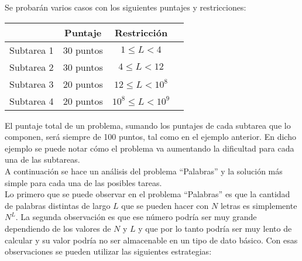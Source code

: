 \begin{ejemplo}
Se probarán varios casos con los siguientes puntajes y restricciones:
\begin{center}
\begin{tabular}{|r|c|c|c} \hline
&{\bf Puntaje} & {\bf Restricción} \\ \hline
Subtarea 1 &30 puntos & $1\leq L<4$ \\
Subtarea 2 &30 puntos & $4\leq L< 12$ \\
Subtarea 3 &20 puntos & $12\leq L<10^8$ \\
Subtarea 4 &20 puntos & $10^8\leq L<10^9$ \\ \hline
\end{tabular}
\end{center}
\end{ejemplo}\bigskip

El puntaje total de un problema, sumando los puntajes de cada subtarea que lo componen, será siempre de 100 puntos, tal como en el ejemplo anterior. En dicho ejemplo se puede notar cómo el problema va aumentando la dificultad
para cada una de las subtareas.\\


A continuación se hace un análisis del problema ``Palabras'' y la solución más
simple para cada una de las posibles tareas.\\

Lo primero que se puede observar en el problema ``Palabras'' es que la cantidad
de palabras distintas de largo $L$ que se pueden hacer con $N$ letras es
simplemente $N^L$.
La segunda observación es que ese número podría ser muy grande dependiendo de
los valores de $N$ y $L$ y que por lo tanto podría ser muy lento de calcular y
su valor podría no ser almacenable en un tipo de dato básico.
Con esas observaciones se pueden utilizar las siguientes estrategias:

